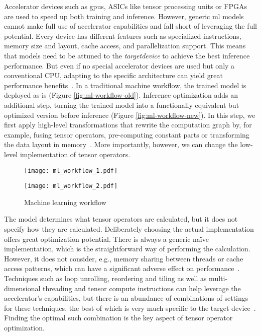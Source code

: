 Accelerator devices such as \glspl{gpu}, ASICs like tensor processing units or FPGAs are used to speed up both training and inference. However, generic \gls{ml} models cannot make full use of accelerator capabilities and fall short of leveraging the full potential. Every device has different features such as specialized instructions, memory size and layout, cache access, and parallelization support. This means that models need to be attuned to the \textit{\gls{targetdevice}} to achieve the best inference performance. But even if no special accelerator devices are used but only a conventional CPU, adapting to the specific architecture can yield great performance benefits~\cite[p.~1]{Liu.2019}. In a traditional machine workflow, the trained model is deployed as-is (Figure \ref{fig:ml-workflow-old}). Inference optimization adds an additional step, turning the trained model into a functionally equivalent but optimized version before inference (Figure \ref{fig:ml-workflow-new}). In this step, we first apply high-level transformations that rewrite the computation graph by, for example, fusing tensor operators, pre-computing constant parts or transforming the data layout in memory~\cites[p.~1--3]{Chen.2018b}. More importantly, however, we can change the low-level implementation of tensor operators.

\begin{figure}
	\begin{minipage}[b]{.5\textwidth}
		\centering\texttt{[image: ml\_workflow\_1.pdf]}
		\label{fig:ml-workflow-old}
	\end{minipage}%
	\begin{minipage}[b]{.5\textwidth}
		\centering\texttt{[image: ml\_workflow\_2.pdf]}
		\label{fig:ml-workflow-new}
	\end{minipage}
	\caption[Traditional vs. optimized machine learning workflow]{Machine learning workflow}
	\label{fig:ml-workflow}
\end{figure}

The model determines what tensor operators are calculated, but it does not specify how they are calculated. Deliberately choosing the actual implementation offers great optimization potential. There is always a generic naïve implementation, which is the straightforward way of performing the calculation. However, it does not consider, e.g., memory sharing between threads or cache access patterns, which can have a significant adverse effect on performance~\cite{Hu.2017}. Techniques such as loop unrolling, reordering and tiling as well as multi-dimensional threading and tensor compute instructions can help leverage the accelerator's capabilities, but there is an abundance of combinations of settings for these techniques, the best of which is very much specific to the target device~\cite[p.~2]{Chen.2018b}. Finding the optimal such combination is the key aspect of tensor operator optimization.

